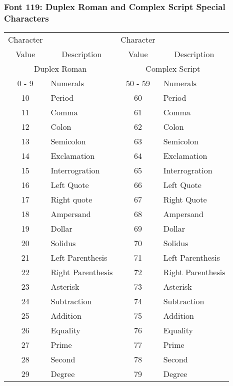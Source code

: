 \subsubsection{Font 119: Duplex Roman and Complex Script
Special Characters}
\begin{tabular}{|c|l|c|l|}
\hline
\multicolumn{1}{|c|}{Character}
& & \multicolumn{1}{|c|}{Character}&\\
\multicolumn{1}{|c|}{Value}
&\multicolumn{1}{|c|}{Description}
&\multicolumn{1}{|c|}{Value}
&\multicolumn{1}{|c|}{Description}\\
\hline
\multicolumn{2}{|c|}{Duplex Roman}
&\multicolumn{2}{|c|}{Complex Script}\\
\hline
0 - 9 & Numerals & 50 - 59 & Numerals\\
10 & Period & 60 & Period\\
11 & Comma & 61 & Comma\\
12 & Colon & 62 & Colon\\
13 & Semicolon & 63 & Semicolon\\
14 & Exclamation & 64 & Exclamation\\
15 & Interrogration & 65 & Interrogration\\
16 & Left Quote & 66 & Left Quote\\
17 & Right quote & 67 & Right Quote\\
18 & Ampersand & 68 & Ampersand\\
19 & Dollar & 69 & Dollar\\
20 & Solidus & 70 & Solidus\\
21 & Left Parenthesis & 71 & Left Parenthesis\\
22 & Right Parenthesis & 72 & Right Parenthesis\\
23 & Asterisk & 73 & Asterisk\\
24 & Subtraction & 74 & Subtraction\\
25 & Addition & 75 & Addition\\
26 & Equality & 76 & Equality\\
27 & Prime & 77 & Prime\\
28 & Second & 78 & Second\\
29 & Degree & 79 & Degree\\ \hline
\end{tabular}
\newpage
